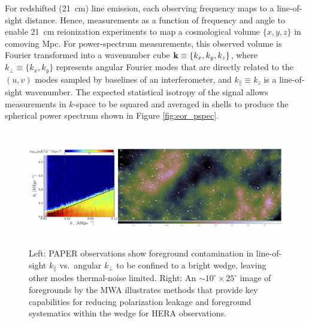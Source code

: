 \documentclass[preprint]{aastex}
\newcommand{\Mycitep}[1]{{\bf \citep{#1}}}
\newcommand{\Caption}[4]{\vspace{#1}\renewcommand{\baselinestretch}{#2}\caption{#4}\vspace{#3}}
\def\kperp{k_{\bot}}
\def\kpar{k_{\|}}
\def\kperp{k_{\bot}}
\def\kpar{k_{\|}}
\def\k{{\bf k}}
\begin{document}
For redshifted (21~cm) line emission, each observing frequency maps to
a line-of-sight distance.  Hence, measurements as a function of frequency and angle 
to enable 21~cm reionization experiments to map a cosmological volume $\{x,y,z\}$ in
comoving Mpc.  For power-spectrum measurements, this observed volume is Fourier transformed into a 
wavenumber cube $\k\equiv\{k_{x}, k_{y}, k_{z}\}$, where 
$\kperp\equiv\{k_{x},k_{y}\}$ represents angular Fourier modes that are directly
related to the $(u,v)$ modes sampled by baselines of an interferometer, and $\kpar\equiv k_{z}$ is
a line-of-sight wavenumber.
The expected statistical isotropy of the signal allows measurements in $k$-space to be
squared and averaged in shells to produce the spherical power spectrum
shown in Figure \ref{fig:eor_pspec}.

\begin{figure}[t] \centering
\includegraphics[height=2in]{plots/Foregrounds/MWA_wedge_consolidated.jpg}
\Caption{-0.3in}{0.99}{-0.15in}{\small Left:
PAPER observations \Mycitep{pober_et_al2013} show foreground contamination 
in line-of-sight $\kpar$ vs.\ angular $\kperp$ to be
confined to a bright wedge,
leaving other modes thermal-noise limited.
Right:
An $\sim10^{\circ} \times 25^{\circ}$ image of foregrounds by the MWA illustrates
methods that provide key capabilities for reducing
polarization leakage and foreground systematics within the wedge for HERA observations.  
}\label{fig:twoFGViews} \end{figure}
\end{document}
